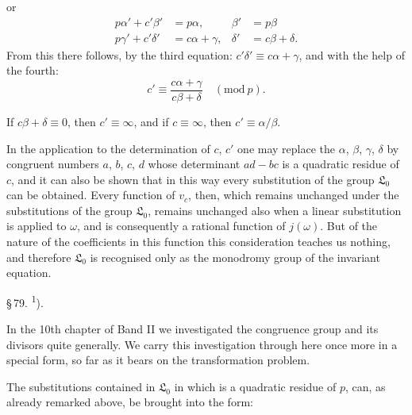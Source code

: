 or
\[
\begin{aligned}
p\alpha' + c'\beta' &= p\alpha, & \beta' &= p\beta\\
p\gamma' + c'\delta' &= c\alpha+\gamma, & \delta' &= c\beta+\delta.
\end{aligned}
\]
From this there follows, by the third equation: $c'\delta' \equiv
c\alpha+\gamma$, and with the help of the fourth:
\[
c' \equiv \frac{c\alpha+\gamma}{c\beta+\delta} \quad (\mathrm{mod}\ p).
\]

If $c\beta+\delta \equiv 0$, then $c' \equiv \infty$, and if
$c \equiv \infty$, then $c' \equiv \alpha/\beta$.

In the application to the determination of $c$, $c'$ one may
replace the $\alpha$, $\beta$, $\gamma$, $\delta$ by congruent numbers $a$, $b$, $c$, $d$
whose determinant $ad-bc$ is a quadratic residue of $c$, %
and it can
also be shown that in this way every substitution of the group
$\mathfrak{L}_0$ can be obtained. Every function of $v_c$, then, which
remains unchanged under the substitutions of the group $\mathfrak{L}_0$,
remains unchanged also when a linear substitution is applied to
$\omega$, and is consequently a rational function of $j(\omega)$. But of
the nature of the coefficients in this function this consideration teaches
us nothing, and therefore $\mathfrak{L}_0$ is recognised only as the monodromy
group of the invariant equation.

\begin{center}
\S\,79. \textsuperscript{1}).
\end{center}

In the 10th chapter of Band II we investigated the congruence group
and its divisors quite generally. We carry this investigation through
here once more in a special form, so far as it bears on the transformation
problem.

The substitutions contained in $\mathfrak{L}_0$
in which
is a quadratic residue of $p$, can, as already remarked above,
be brought into the form:

\begingroup
\renewcommand{\thefootnote}{1)}
\endgroup
